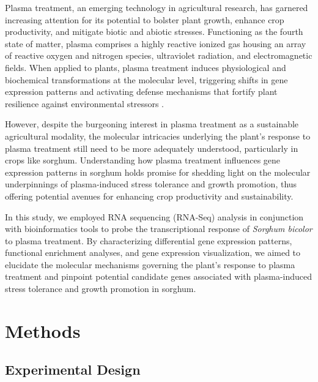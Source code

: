 \documentclass[12pt,letterpaper]{article}
\begin{document}
Plasma treatment, an emerging technology in agricultural research, has garnered increasing attention for its potential to bolster plant growth, enhance crop productivity, and mitigate biotic and abiotic stresses. Functioning as the fourth state of matter, plasma comprises a highly reactive ionized gas housing an array of reactive oxygen and nitrogen species, ultraviolet radiation, and electromagnetic fields. When applied to plants, plasma treatment induces physiological and biochemical transformations at the molecular level, triggering shifts in gene expression patterns and activating defense mechanisms that fortify plant resilience against environmental stressors \parencite{attriplasma}.

However, despite the burgeoning interest in plasma treatment as a sustainable agricultural modality, the molecular intricacies underlying the plant's response to plasma treatment still need to be more adequately understood, particularly in crops like sorghum. Understanding how plasma treatment influences gene expression patterns in sorghum holds promise for shedding light on the molecular underpinnings of plasma-induced stress tolerance and growth promotion, thus offering potential avenues for enhancing crop productivity and sustainability.

In this study, we employed RNA sequencing (RNA-Seq) analysis in conjunction with bioinformatics tools to probe the transcriptional response of \textit{Sorghum bicolor} to plasma treatment. By characterizing differential gene expression patterns, functional enrichment analyses, and gene expression visualization, we aimed to elucidate the molecular mechanisms governing the plant's response to plasma treatment and pinpoint potential candidate genes associated with plasma-induced stress tolerance and growth promotion in sorghum.

\section{Methods}

\subsection{Experimental Design}
\end{document}
